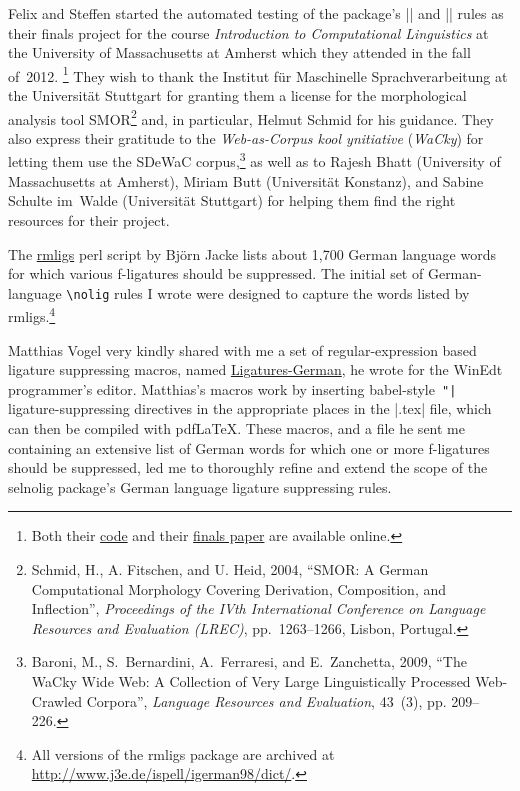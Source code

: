 \documentclass[11pt]{article}
\newcommand{\pkg}[1]{\textsf{#1}}
\newcommand{\cmmd}[1]{\texttt{\textbackslash #1}}
\begin{document}
Felix and Steffen started the automated testing of the package's |\nolig| and |\keeplig| rules as their finals project for the course \emph{Introduction to Computational Linguistics} at the University of Massachusetts at Amherst which they attended in the fall of~2012.%
\footnote{Both their \href{https://github.com/SHildebrandt/selnolig-check}{code} and their \href{https://github.com/SHildebrandt/selnolig-check/blob/master/selnolig-check-documentation.pdf?raw=true}{finals paper} are available online.} They wish to thank the Institut für Maschinelle Sprachverarbeitung at the Universität Stuttgart for granting them a license for the morphological analysis tool SMOR\footnote{Schmid, H., A. Fitschen, and U. Heid, 2004, \enquote{SMOR: A German Computational Morphology Covering Derivation, Composition, and Inflection}, \emph{Proceedings of the IVth International Conference on Language Resources and Evaluation (LREC)}, pp.~1263--1266, Lisbon, Portugal.} and, in particular, Helmut Schmid for his guidance. They also express their gratitude to the \emph{Web-as-Corpus kool ynitiative} (\emph{WaCky}) for letting them use the SDeWaC corpus,\footnote{Baroni, M., S.~Bernardini, A.~Ferraresi, and E.~Zanchetta, 2009, \enquote{The WaCky Wide Web: A Collection of Very Large Linguistically Processed Web-Crawled Corpora}, \emph{Language Resources and Evaluation}, 43~(3), pp. 209--226.} as well as to Rajesh Bhatt (University of Massachusetts at Amherst), Miriam Butt (Universität Konstanz), and Sabine Schulte im~Walde (Universität Stuttgart) for helping them find the right resources for their project.

The \href{http://www.ctan.org/tex-archive/support/rmligs}{\pkg{rmligs}} perl script by Björn Jacke lists about 1,700 German language words for which various f-ligatures should be suppressed. The initial set of German-language \cmmd{nolig} rules I wrote were designed to capture the words listed by \pkg{rmligs}.\footnote{All versions of the \pkg{rmligs} package are archived at \url{http://www.j3e.de/ispell/igerman98/dict/}.} 

Matthias Vogel very kindly shared with me a set of regular-expression based ligature suppressing macros, named \href{http://www.winedt.org/Macros/LaTeX/Ligatures-German.php}{Ligatures-German}, he wrote for the WinEdt programmer's editor. Matthias's macros work by inserting \pkg{babel}-style~\Verb+"|+ ligature-suppressing  directives in the appropriate places in the |.tex| file, which can then be compiled with pdf\LaTeX. These macros, and a file he sent me containing an extensive list of German words for which one or more f-ligatures should be suppressed, led me to thoroughly refine and extend the scope of the \pkg{selnolig} package's German language ligature suppressing rules.
\end{document}
